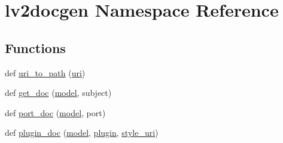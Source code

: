 \hypertarget{namespacelv2docgen}{}\section{lv2docgen Namespace Reference}
\label{namespacelv2docgen}
\subsection*{Functions}
\begin{DoxyCompactItemize}
\item 
def \hyperlink{namespacelv2docgen_a4bded19b57aa94a9f14d74ebce83c470}{uri\+\_\+to\+\_\+path} (\hyperlink{lib_2expat_8h_a5a9fdd6c2606370ad12f24c078ac6585}{uri})
\item 
def \hyperlink{namespacelv2docgen_a3fb8f6c76d5c87762bb1aa98fa6e454a}{get\+\_\+doc} (\hyperlink{lib_2expat_8h_ac517f0c27408fbd365e7dd34e032faca}{model}, subject)
\item 
def \hyperlink{namespacelv2docgen_a89de4fc46e4583f0b5879cfc7a747c80}{port\+\_\+doc} (\hyperlink{lib_2expat_8h_ac517f0c27408fbd365e7dd34e032faca}{model}, port)
\item 
def \hyperlink{namespacelv2docgen_aaa222eb953c3fe42990ce8641fc9e84b}{plugin\+\_\+doc} (\hyperlink{lib_2expat_8h_ac517f0c27408fbd365e7dd34e032faca}{model}, \hyperlink{namespacelv2docgen_afc728ef34e814436971ab700cb7db3de}{plugin}, \hyperlink{namespacelv2docgen_aa8202cda5fd7a4be38bce51b21fed0c0}{style\+\_\+uri})
\end{DoxyCompactItemize}
